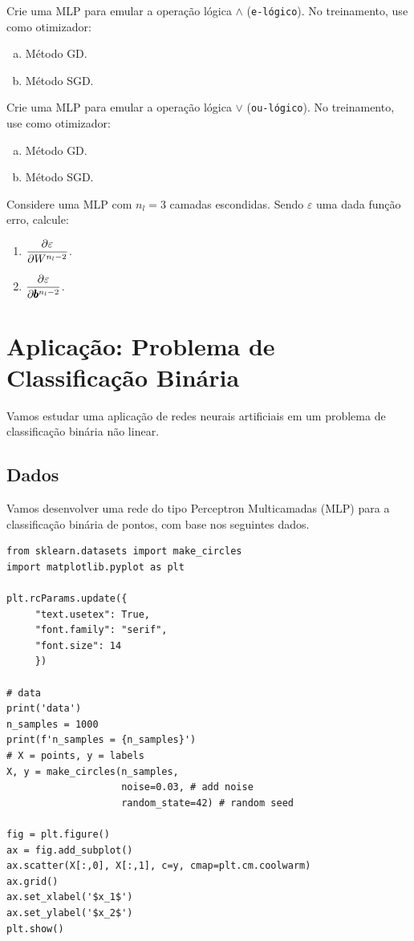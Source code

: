 \begin{exer}
  Crie uma MLP para emular a operação lógica $\land$ (\texttt{e-lógico}). No treinamento, use como otimizador:
  \begin{enumerate}[a)]
  \item Método GD.
  \item Método SGD.
  \end{enumerate}
\end{exer}

\begin{exer}
  Crie uma MLP para emular a operação lógica $\lor$ (\texttt{ou-lógico}). No treinamento, use como otimizador:
  \begin{enumerate}[a)]
  \item Método GD.
  \item Método SGD.
  \end{enumerate}
\end{exer}

\begin{exer}
  Considere uma MLP com $n_l=3$ camadas escondidas. Sendo $\varepsilon$ uma dada função erro, calcule:
  \begin{enumerate}
  \item $\displaystyle \frac{\partial\varepsilon}{\partial W^{n_l-2}}$.
  \item $\displaystyle \frac{\partial\varepsilon}{\partial \pmb{b}^{n_l-2}}$.
  \end{enumerate}
\end{exer}



\section{Aplicação: Problema de Classificação Binária}\label{cap_mlp_sec_classbin}
\badgeConstrucao

Vamos estudar uma aplicação de redes neurais artificiais em um problema de classificação binária não linear.

\subsection{Dados}
\badgeConstrucao

Vamos desenvolver uma rede do tipo Perceptron Multicamadas (MLP) para a classificação binária de pontos, com base nos seguintes dados.

\begin{lstlisting}
from sklearn.datasets import make_circles
import matplotlib.pyplot as plt

plt.rcParams.update({
     "text.usetex": True,
     "font.family": "serif",
     "font.size": 14
     })

# data
print('data')
n_samples = 1000
print(f'n_samples = {n_samples}')
# X = points, y = labels
X, y = make_circles(n_samples,
                    noise=0.03, # add noise
                    random_state=42) # random seed

fig = plt.figure()
ax = fig.add_subplot()
ax.scatter(X[:,0], X[:,1], c=y, cmap=plt.cm.coolwarm)
ax.grid()
ax.set_xlabel('$x_1$')
ax.set_ylabel('$x_2$')
plt.show()
\end{lstlisting}


